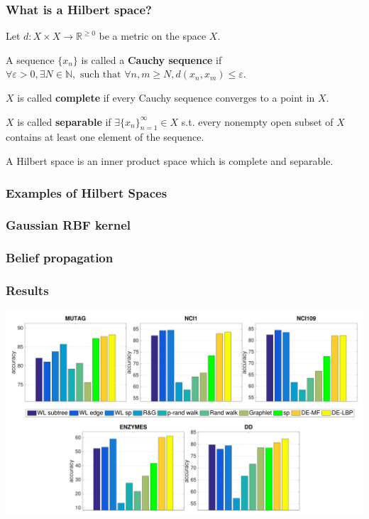 \documentclass{beamer}
\begin{document}
    \begin{frame}
        \frametitle{What is a Hilbert space?}
            Let $d: X\times X \rightarrow \mathbb R^{\geq 0}$ be a metric on the space $X$. \\
        \begin{definition}
            A sequence $\{x_n\}$ is called a \textbf{Cauchy sequence} if $\forall \varepsilon > 0, \exists N \in \mathbb{N}, \text{ such that } \forall n,m \geq N, d(x_n,x_m)\leq \varepsilon$. \\
        \end{definition}
        \begin{definition}
            $X$ is called \textbf{complete} if every Cauchy sequence converges to a point in $X$.
        \end{definition}
        \begin{definition}
            $X$ is called \textbf{separable} if $\exists \{x_n\}_{n = 1}^\infty \in X$ s.t. every nonempty open subset of $X$ contains at least one element of the sequence.
        \end{definition}
        \begin{definition}
            A Hilbert space is an inner product space which is complete and separable.
        \end{definition}
    \end{frame}

    \begin{frame}
        \frametitle{Examples of Hilbert Spaces}
    \end{frame}

    \begin{frame}
        \frametitle{Gaussian RBF kernel}
    \end{frame}

    \begin{frame}
        \frametitle{Belief propagation}
    \end{frame}

    \begin{frame}
        \frametitle{Results}
        \begin{center}
        \includegraphics[width=\textwidth]{results.png}
        \end{center}
    \end{frame}
\end{document}
